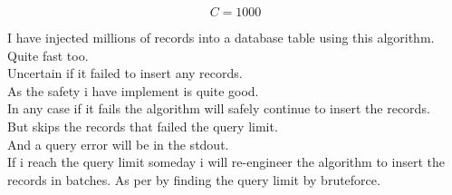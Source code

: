 \begin{equation}
    C = 1000
\end{equation}

I have injected millions of records into a database table using this algorithm. \\
Quite fast too. \\
Uncertain if it failed to insert any records. \\
As the safety i have implement is quite good. \\
In any case if it fails the algorithm will safely continue to insert the records. \\
But skips the records that failed the query limit. \\ 
And a query error will be in the stdout. \\

If i reach the query limit someday i will re-engineer the algorithm to insert the records in batches. As per by finding the query limit by bruteforce. \\
